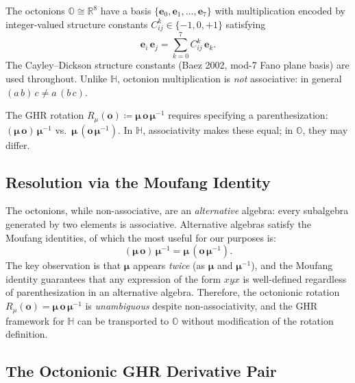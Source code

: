 \documentclass[11pt]{article}
\newcommand{\OO}{\mathbb{O}}
\newcommand{\HH}{\mathbb{H}}
\newcommand{\RR}{\mathbb{R}}
\newcommand{\ee}[1]{\mathbf{e}_{#1}}
\newcommand{\defeq}{\coloneqq}
\begin{document}
The octonions $\OO \cong \RR^8$ have a basis
$\{\ee{0}, \ee{1}, \ldots, \ee{7}\}$ with multiplication encoded by
integer-valued structure constants $C_{ij}^k \in \{-1,0,+1\}$ satisfying
\begin{equation}
  \ee{i}\,\ee{j} = \sum_{k=0}^{7} C_{ij}^k\,\ee{k}.
\end{equation}
The Cayley--Dickson structure constants (Baez 2002, mod-7 Fano plane basis) are
used throughout.  Unlike $\HH$, octonion multiplication is \emph{not}
associative: in general $(a\,b)\,c \neq a\,(b\,c)$.

The GHR rotation $R_\mu(\mathbf{o}) \defeq \boldsymbol{\mu}\,\mathbf{o}\,\boldsymbol{\mu}^{-1}$
requires specifying a parenthesization:
$(\boldsymbol{\mu}\,\mathbf{o})\,\boldsymbol{\mu}^{-1}$
vs.\
$\boldsymbol{\mu}\,(\mathbf{o}\,\boldsymbol{\mu}^{-1})$.
In $\HH$, associativity makes these equal; in $\OO$, they may differ.

\subsection{Resolution via the Moufang Identity}

The octonions, while non-associative, are an \emph{alternative} algebra:
every subalgebra generated by two elements is associative.  Alternative algebras
satisfy the Moufang identities, of which the most useful for our purposes is:
\begin{equation}\label{eq:moufang}
  (\boldsymbol{\mu}\,\mathbf{o})\,\boldsymbol{\mu}^{-1}
  = \boldsymbol{\mu}\,(\mathbf{o}\,\boldsymbol{\mu}^{-1}).
\end{equation}
The key observation is that $\boldsymbol{\mu}$ appears \emph{twice} (as
$\boldsymbol{\mu}$ and $\boldsymbol{\mu}^{-1}$), and the Moufang identity
guarantees that any expression of the form $xyx$ is well-defined regardless of
parenthesization in an alternative algebra.  Therefore, the octonionic rotation
$R_\mu(\mathbf{o}) = \boldsymbol{\mu}\,\mathbf{o}\,\boldsymbol{\mu}^{-1}$ is
\emph{unambiguous} despite non-associativity, and the GHR framework for $\HH$
can be transported to $\OO$ without modification of the rotation definition.

\subsection{The Octonionic GHR Derivative Pair}
\end{document}
